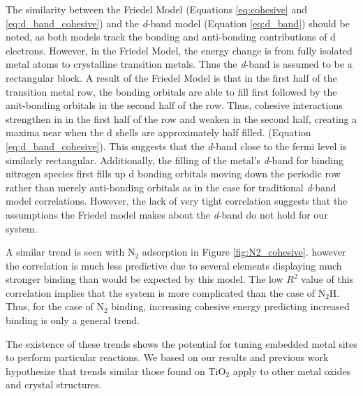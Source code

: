 The similarity between the Friedel Model (Equations \ref{eq:cohesive} and \ref{eq:d_band_cohesive}) and the \textit{d}-band model (Equation \ref{eq:d_band}) should be noted, as both models track the bonding and anti-bonding contributions of d electrons. However, in the Friedel Model, the energy change is from fully isolated metal atoms to crystalline transition metals. Thus the \textit{d}-band is assumed to be a rectangular block. A result of the Friedel Model is that in the first half of the transition metal row, the bonding orbitals are able to fill first followed by the anit-bonding orbitals in the second half of the row. Thus, cohesive interactions strengthen in in the first half of the row and weaken in the second half, creating a maxima near when the d shells are approximately half filled. (Equation \ref{eq:d_band_cohesive}). This suggests that the \textit{d}-band close to the fermi level is similarly rectangular. Additionally, the filling of the metal's \textit{d}-band for binding nitrogen species first fills up d bonding orbitals moving down the periodic row rather than merely anti-bonding orbitals as in the case for traditional \textit{d}-band model correlations. However, the lack of very tight correlation suggests that the assumptions the Friedel model makes about the \textit{d}-band do not hold for our system.



A similar trend is seen with N$_2$ adsorption in Figure \ref{fig:N2_cohesive}. however the correlation is much less predictive due to several elements displaying much stronger binding than would be expected by this model. The low $R^2$ value of this correlation implies that the system is more complicated than the case of N$_2$H. Thus, for the case of N$_2$ binding, increasing cohesive energy predicting increased binding is only a general trend. 

The existence of these trends shows the potential for tuning embedded metal sites to perform particular reactions. We based on our results and previous work \cite{Xu_2015,Garc_a_Mota_2011,Yao_2017} hypothesize that trends similar those found on TiO$_2$ apply to other metal oxides and crystal structures.





